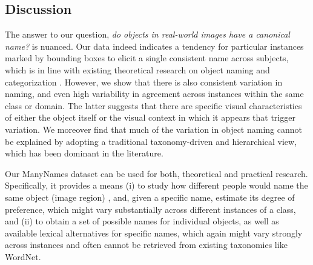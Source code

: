 
\subsection{Discussion}
\label{subsec:discuss}


The answer to our question, \textit{do objects in real-world images have a canonical name?} is nuanced. 
Our data indeed indicates a tendency for particular instances marked by bounding boxes to elicit a single consistent name across subjects, which is in line with existing theoretical research on object naming and categorization . 
However, we show that there is also consistent variation in naming, and even high variability in agreement across instances within the same class or domain. 
The latter suggests that there are specific visual characteristics of either the object itself or the visual context in which it appears that trigger variation.  
We moreover find that much of the variation in object naming cannot be explained by adopting a traditional taxonomy-driven and hierarchical view, which has been dominant in the literature.

Our ManyNames dataset can be used for both, theoretical and practical research. 
Specifically, it provides a means 
(i) to study how different people would name the same object (image region) , and, given a specific name, estimate its degree of preference, which might vary substantially across different instances of a class, and   
(ii) to obtain a set of possible names for individual objects, as well as available lexical alternatives for specific names, which again might vary strongly across instances and often cannot be retrieved from existing taxonomies like WordNet. 

